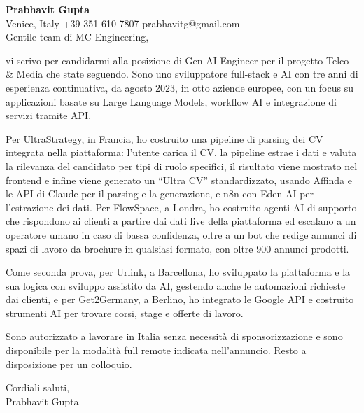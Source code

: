 \documentclass[a4paper,10.5pt]{article}
\begin{document}
\textbf{Prabhavit Gupta}\\
Venice, Italy \textbar{} +39 351 610 7807 \textbar{} prabhavitg@gmail.com\\[10pt]
Gentile team di MC Engineering,

vi scrivo per candidarmi alla posizione di Gen AI Engineer per il progetto Telco \& Media che state seguendo. Sono uno sviluppatore full-stack e AI con tre anni di esperienza continuativa, da agosto 2023, in otto aziende europee, con un focus su applicazioni basate su Large Language Models, workflow AI e integrazione di servizi tramite API.

Per UltraStrategy, in Francia, ho costruito una pipeline di parsing dei CV integrata nella piattaforma: l'utente carica il CV, la pipeline estrae i dati e valuta la rilevanza del candidato per tipi di ruolo specifici, il risultato viene mostrato nel frontend e infine viene generato un ``Ultra CV'' standardizzato, usando Affinda e le API di Claude per il parsing e la generazione, e n8n con Eden AI per l'estrazione dei dati. Per FlowSpace, a Londra, ho costruito agenti AI di supporto che rispondono ai clienti a partire dai dati live della piattaforma ed escalano a un operatore umano in caso di bassa confidenza, oltre a un bot che redige annunci di spazi di lavoro da brochure in qualsiasi formato, con oltre 900 annunci prodotti.

Come seconda prova, per Urlink, a Barcellona, ho sviluppato la piattaforma e la sua logica con sviluppo assistito da AI, gestendo anche le automazioni richieste dai clienti, e per Get2Germany, a Berlino, ho integrato le Google API e costruito strumenti AI per trovare corsi, stage e offerte di lavoro.

Sono autorizzato a lavorare in Italia senza necessit\`a di sponsorizzazione e sono disponibile per la modalit\`a full remote indicata nell'annuncio. Resto a disposizione per un colloquio.

Cordiali saluti,\\
Prabhavit Gupta
\end{document}
